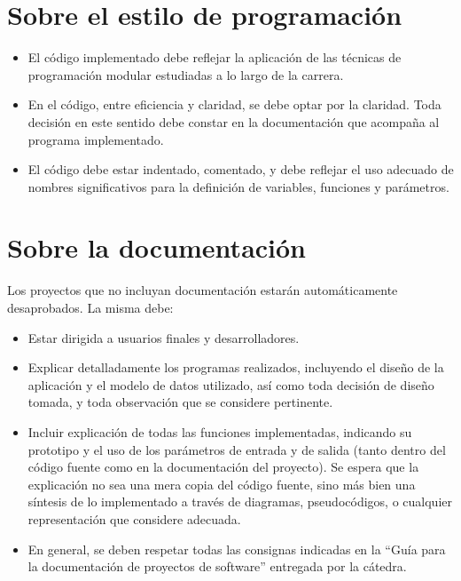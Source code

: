 \documentclass[12pt,a4paper]{article}
\begin{document}
\section*{Sobre el estilo de programación}
\begin{itemize}
		
	\item El código implementado debe reflejar la aplicación de las técnicas de programación modular estudiadas a lo largo de la carrera.
	
	\item En el código, entre eficiencia y claridad, se debe optar por la claridad. Toda decisión en este sentido debe constar en la documentación que acompaña al programa implementado.
	
	\item El código debe estar indentado, comentado, y debe reflejar el uso adecuado de nombres significativos para la definición de variables, funciones y parámetros.
	
\end{itemize}

\section*{Sobre la documentación}

Los proyectos que no incluyan documentación estarán automáticamente desaprobados. La misma debe:
\begin{itemize}
	
	\item Estar dirigida a usuarios finales y desarrolladores.
	
	\item Explicar detalladamente los programas realizados, incluyendo el diseño de la aplicación y el modelo de datos utilizado, así como toda decisión de diseño tomada, y toda observación que se considere pertinente.
	
	\item Incluir explicación de todas las funciones implementadas, indicando su prototipo y el uso de los parámetros de entrada y de salida (tanto dentro del código fuente como en la documentación del proyecto). Se espera que la explicación no sea una mera copia del código fuente, sino más bien una síntesis de lo implementado a través de diagramas, pseudocódigos, o cualquier representación que considere adecuada.
	
	\item En general, se deben respetar todas las consignas indicadas en la “Guía para la documentación de proyectos de software” entregada por la cátedra.
	
\end{itemize}
\end{document}

